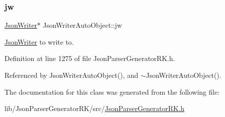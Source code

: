 \subsubsection{\texorpdfstring{jw}{jw}}
{\footnotesize\ttfamily \hyperlink{class_json_writer}{Json\+Writer}$\ast$ Json\+Writer\+Auto\+Object\+::jw\hspace{0.3cm}{\ttfamily [protected]}}



\hyperlink{class_json_writer}{Json\+Writer} to write to. 



Definition at line 1275 of file Json\+Parser\+Generator\+R\+K.\+h.



Referenced by Json\+Writer\+Auto\+Object(), and $\sim$\+Json\+Writer\+Auto\+Object().



The documentation for this class was generated from the following file\+:\begin{DoxyCompactItemize}
\item 
lib/\+Json\+Parser\+Generator\+R\+K/src/\hyperlink{_json_parser_generator_r_k_8h}{Json\+Parser\+Generator\+R\+K.\+h}\end{DoxyCompactItemize}
